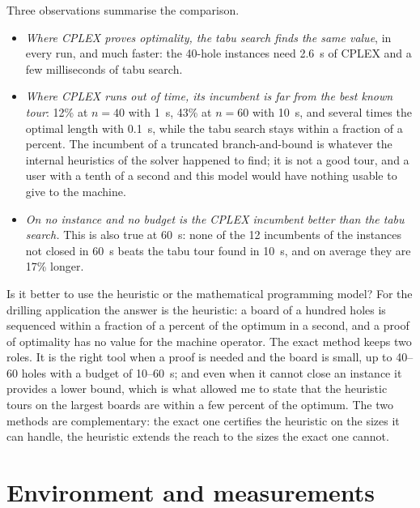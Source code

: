 \documentclass[11pt,a4paper]{article}
\begin{document}
Three observations summarise the comparison.
\begin{itemize}
  \item \emph{Where CPLEX proves optimality, the tabu search finds the same value}, in every
    run, and much faster: the 40-hole instances need 2.6~s of CPLEX and a few milliseconds of
    tabu search.
  \item \emph{Where CPLEX runs out of time, its incumbent is far from the best known tour}:
    12\% at $n=40$ with 1~s, 43\% at $n=60$ with 10~s, and several times the optimal length
    with 0.1~s, while the tabu search stays within a fraction of a percent. The incumbent of a
    truncated branch-and-bound is whatever the internal heuristics of the solver happened to
    find; it is not a good tour, and a user with a tenth of a second and this model would
    have nothing usable to give to the machine.
  \item \emph{On no instance and no budget is the CPLEX incumbent better than the tabu
    search.} This is also true at 60~s: none of the 12 incumbents of the instances not closed
    in 60~s beats the tabu tour found in 10~s, and on average they are 17\% longer.
\end{itemize}
Is it better to use the heuristic or the mathematical programming model? For the drilling
application the answer is the heuristic: a board of a hundred holes is sequenced within a
fraction of a percent of the optimum in a second, and a proof of optimality has no value for
the machine operator. The exact method keeps two roles. It is the right tool when a proof is
needed and the board is small, up to 40--60 holes with a budget of 10--60~s; and even when
it cannot close an instance it provides a lower bound, which is what allowed me to state that
the heuristic tours on the largest boards are within a few percent of the optimum. The two
methods are complementary: the exact one certifies the heuristic on the sizes it can handle,
the heuristic extends the reach to the sizes the exact one cannot.

\small

\normalsize

\section{Environment and measurements}\label{sec:env}
\end{document}
